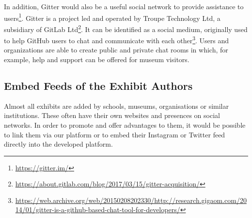 In addition, Gitter would also be a useful social network to provide assistance to users\footnote{\url{https://gitter.im/}}. Gitter is a project led and operated by Troupe Technology Ltd, a subsidiary of GitLab Ltd\footnote{\url{https://about.gitlab.com/blog/2017/03/15/gitter-acquisition/}}. It can be identified as a social medium, originally used to help GitHub users to chat and communicate with each other\footnote{\url{https://web.archive.org/web/20150208202330/http://research.gigaom.com/2014/01/gitter-is-a-github-based-chat-tool-for-developers/}}. Users and organizations are able to create public and private chat rooms in which, for example, help and support can be offered for museum visitors.

\subsection{Embed Feeds of the Exhibit Authors} \label{social_feeds}

Almost all exhibits are added by schools, museums, organisations or similar institutions. These often have their own websites and presences on social networks. In order to promote and offer advantages to them, it would be possible to link them via our platform or to embed their Instagram or Twitter feed directly into the developed platform.

